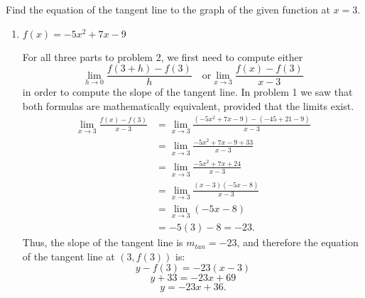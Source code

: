 \documentclass[nooutcomes]{ximera}
\begin{document}
	
	
	
			
			

\begin{problem}
Find the equation of the tangent line to the graph of the given function at $x=3$.

	\begin{enumerate}
	
	\item  $f(x) = -5x^2 + 7x - 9$
		\begin{freeResponse}
		For all three parts to problem 2, we first need to compute either 
		$$\lim_{h \to 0} \frac{f(3+h) - f(3)}{h} \quad \text{or} \lim_{x \to 3} \frac{f(x) - f(3)}{x-3}$$ 
		in order to compute the slope of the tangent line.  In problem 1 we saw that both formulas are mathematically equivalent, provided that the limits exist.  
		\begin{align*}
		\lim_{x \to 3} \frac{f(x) - f(3)}{x-3}
		&= \lim_{x \to 3} \frac{(-5x^2 + 7x - 9) - (-45 + 21 - 9)}{x-3}  \\
		&= \lim_{x \to 3} \frac{-5x^2 + 7x - 9 + 33}{x-3}  \\
		&= \lim_{x \to 3} \frac{-5x^2 + 7x + 24}{x-3}  \\
		&= \lim_{x \to 3} \frac{(x-3)(-5x -8)}{x-3}  \\
		&= \lim_{x \to 3} (-5x - 8)  \\
		&= -5(3) - 8 = -23.
		\end{align*}
		Thus, the slope of the tangent line is $m_{tan}=-23$, and therefore the equation of the tangent line at $(3, f(3))$ is:
		$$y - f(3) = -23(x-3)$$
		$$y + 33 = -23x + 69$$
		$$y = -23x + 36.$$
		\end{freeResponse}
		
		
		

\end{enumerate}
\end{problem}
\end{document}
